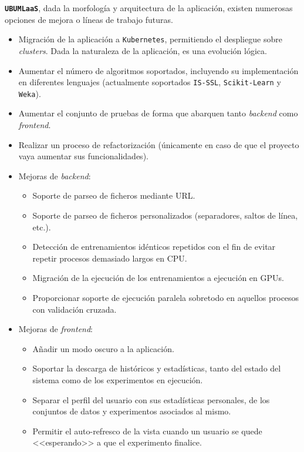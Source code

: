 \textbf{\texttt{UBUMLaaS}}, dada la morfología y arquitectura de la aplicación, existen numerosas opciones de mejora o líneas de trabajo futuras.
\begin{itemize}
\tightlist
\item Migración de la aplicación a \texttt{Kubernetes}, permitiendo el despliegue sobre \textit{clusters}. Dada la naturaleza de la aplicación, es una evolución lógica.
\item Aumentar el número de algoritmos soportados, incluyendo su implementación en diferentes lenguajes (actualmente soportados \texttt{IS-SSL}, \texttt{Scikit-Learn} y \texttt{Weka}).
\item Aumentar el conjunto de pruebas de forma que abarquen tanto \textit{backend} como \textit{frontend}.
\item Realizar un proceso de refactorización (únicamente en caso de que el proyecto vaya aumentar sus funcionalidades).
\item Mejoras de \textit{backend}:
	\begin{itemize}
	\tightlist
	\item Soporte de parseo de ficheros mediante URL.
	\item Soporte de parseo de ficheros personalizados (separadores, saltos de línea, etc.).
	\item Detección de entrenamientos idénticos repetidos con el fin de evitar repetir procesos demasiado largos en CPU.
	\item Migración de la ejecución de los entrenamientos a ejecución en GPUs.
	\item Proporcionar soporte de ejecución paralela sobretodo en aquellos procesos con validación cruzada.
	\end{itemize}
\item Mejoras de \textit{frontend}:
	\begin{itemize}
	\tightlist
	\item Añadir un modo oscuro a la aplicación.
	\item Soportar la descarga de históricos y estadísticas, tanto del estado del sistema como de los experimentos en ejecución.
	\item Separar el perfil del usuario con sus estadísticas personales, de los conjuntos de datos y experimentos asociados al mismo.
	\item Permitir el auto-refresco de la vista cuando un usuario se quede <<esperando>> a que el experimento finalice.
	\end{itemize}
\end{itemize}

